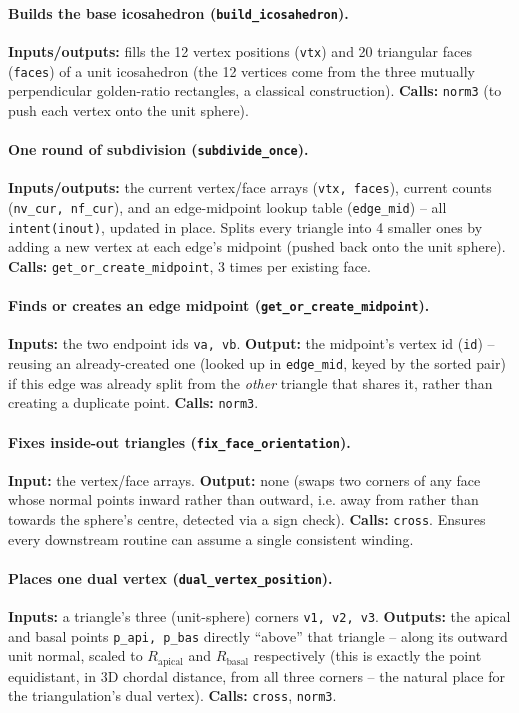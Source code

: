 \documentclass[11pt,a4paper]{report}
\begin{document}
\paragraph{Builds the base icosahedron (\texttt{build\_icosahedron}).}
\textbf{Inputs/outputs:} fills the 12 vertex positions
(\texttt{vtx}) and 20 triangular faces (\texttt{faces}) of a unit
icosahedron (the 12 vertices come from the three mutually
perpendicular golden-ratio rectangles, a classical construction).
\textbf{Calls:} \texttt{norm3} (to push each vertex onto the unit
sphere).
\paragraph{One round of subdivision (\texttt{subdivide\_once}).}
\textbf{Inputs/outputs:} the current vertex/face arrays
(\texttt{vtx, faces}), current counts (\texttt{nv\_cur, nf\_cur}), and
an edge-midpoint lookup table (\texttt{edge\_mid}) -- all
\texttt{intent(inout)}, updated in place. Splits every triangle into 4
smaller ones by adding a new vertex at each edge's midpoint (pushed
back onto the unit sphere). \textbf{Calls:}
\texttt{get\_or\_create\_midpoint}, 3 times per existing face.
\paragraph{Finds or creates an edge midpoint
(\texttt{get\_or\_create\_midpoint}).} \textbf{Inputs:} the two
endpoint ids \texttt{va, vb}. \textbf{Output:} the midpoint's vertex id
(\texttt{id}) -- reusing an already-created one (looked up in
\texttt{edge\_mid}, keyed by the sorted pair) if this edge was already
split from the \emph{other} triangle that shares it, rather than
creating a duplicate point. \textbf{Calls:} \texttt{norm3}.
\paragraph{Fixes inside-out triangles (\texttt{fix\_face\_orientation}).}
\textbf{Input:} the vertex/face arrays. \textbf{Output:} none (swaps
two corners of any face whose normal points inward rather than
outward, i.e. away from rather than towards the sphere's centre,
detected via a sign check). \textbf{Calls:} \texttt{cross}. Ensures
every downstream routine can assume a single consistent winding.
\paragraph{Places one dual vertex (\texttt{dual\_vertex\_position}).}
\textbf{Inputs:} a triangle's three (unit-sphere) corners \texttt{v1,
v2, v3}. \textbf{Outputs:} the apical and basal points
\texttt{p\_api, p\_bas} directly ``above'' that triangle -- along its
outward unit normal, scaled to $R_{\mathrm{apical}}$ and
$R_{\mathrm{basal}}$ respectively (this is exactly the point
equidistant, in 3D chordal distance, from all three corners -- the
natural place for the triangulation's dual vertex). \textbf{Calls:}
\texttt{cross}, \texttt{norm3}.
\end{document}
